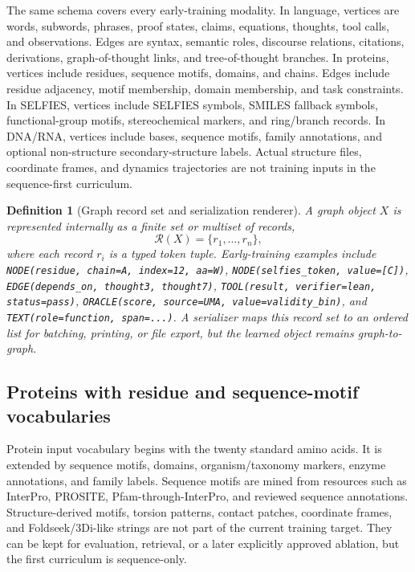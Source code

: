 \documentclass[11pt]{article}
\newtheorem{definition}{Definition}[section]
\newcommand{\1}{\mathbf{1}}
\begin{document}
The same schema covers every early-training modality. In language, vertices are words, subwords, phrases, proof states, claims, equations, thoughts, tool calls, and observations. Edges are syntax, semantic roles, discourse relations, citations, derivations, graph-of-thought links, and tree-of-thought branches. In proteins, vertices include residues, sequence motifs, domains, and chains. Edges include residue adjacency, motif membership, domain membership, and task constraints. In SELFIES, vertices include SELFIES symbols, SMILES fallback symbols, functional-group motifs, stereochemical markers, and ring/branch records. In DNA/RNA, vertices include bases, sequence motifs, family annotations, and optional non-structure secondary-structure labels. Actual structure files, coordinate frames, and dynamics trajectories are not training inputs in the sequence-first curriculum.

\begin{definition}[Graph record set and serialization renderer]
A graph object $X$ is represented internally as a finite set or multiset of records,
\[
  \mathcal R(X)=\{r_1,\ldots,r_n\},
\]
where each record $r_i$ is a typed token tuple. Early-training examples include \texttt{NODE(residue, chain=A, index=12, aa=W)}, \texttt{NODE(selfies\_token, value=[C])}, \texttt{EDGE(depends\_on, thought3, thought7)}, \texttt{TOOL(result, verifier=lean, status=pass)}, \texttt{ORACLE(score, source=UMA, value=validity\_bin)}, and \texttt{TEXT(role=function, span=...)}. A serializer maps this record set to an ordered list for batching, printing, or file export, but the learned object remains graph-to-graph.
\end{definition}

\subsection{Proteins with residue and sequence-motif vocabularies}

Protein input vocabulary begins with the twenty standard amino acids. It is extended by sequence motifs, domains, organism/taxonomy markers, enzyme annotations, and family labels. Sequence motifs are mined from resources such as InterPro, PROSITE, Pfam-through-InterPro, and reviewed sequence annotations. Structure-derived motifs, torsion patterns, contact patches, coordinate frames, and Foldseek/3Di-like strings are not part of the current training target. They can be kept for evaluation, retrieval, or a later explicitly approved ablation, but the first curriculum is sequence-only.
\end{document}
